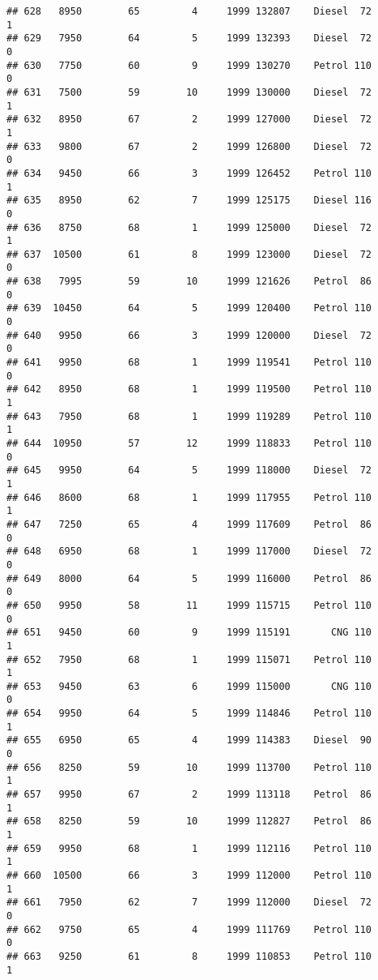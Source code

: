 \documentclass[]{article}
\begin{document}
\begin{verbatim}
## 628   8950        65         4     1999 132807    Diesel  72         1
## 629   7950        64         5     1999 132393    Diesel  72         0
## 630   7750        60         9     1999 130270    Petrol 110         0
## 631   7500        59        10     1999 130000    Diesel  72         1
## 632   8950        67         2     1999 127000    Diesel  72         1
## 633   9800        67         2     1999 126800    Diesel  72         0
## 634   9450        66         3     1999 126452    Petrol 110         1
## 635   8950        62         7     1999 125175    Diesel 116         0
## 636   8750        68         1     1999 125000    Diesel  72         1
## 637  10500        61         8     1999 123000    Diesel  72         0
## 638   7995        59        10     1999 121626    Petrol  86         0
## 639  10450        64         5     1999 120400    Petrol 110         0
## 640   9950        66         3     1999 120000    Diesel  72         0
## 641   9950        68         1     1999 119541    Petrol 110         0
## 642   8950        68         1     1999 119500    Petrol 110         1
## 643   7950        68         1     1999 119289    Petrol 110         1
## 644  10950        57        12     1999 118833    Petrol 110         0
## 645   9950        64         5     1999 118000    Diesel  72         1
## 646   8600        68         1     1999 117955    Petrol 110         1
## 647   7250        65         4     1999 117609    Petrol  86         0
## 648   6950        68         1     1999 117000    Diesel  72         0
## 649   8000        64         5     1999 116000    Petrol  86         0
## 650   9950        58        11     1999 115715    Petrol 110         0
## 651   9450        60         9     1999 115191       CNG 110         1
## 652   7950        68         1     1999 115071    Petrol 110         1
## 653   9450        63         6     1999 115000       CNG 110         0
## 654   9950        64         5     1999 114846    Petrol 110         1
## 655   6950        65         4     1999 114383    Diesel  90         0
## 656   8250        59        10     1999 113700    Petrol 110         1
## 657   9950        67         2     1999 113118    Petrol  86         1
## 658   8250        59        10     1999 112827    Petrol  86         1
## 659   9950        68         1     1999 112116    Petrol 110         1
## 660  10500        66         3     1999 112000    Petrol 110         1
## 661   7950        62         7     1999 112000    Diesel  72         0
## 662   9750        65         4     1999 111769    Petrol 110         0
## 663   9250        61         8     1999 110853    Petrol 110         1

\end{verbatim}
\end{document}
